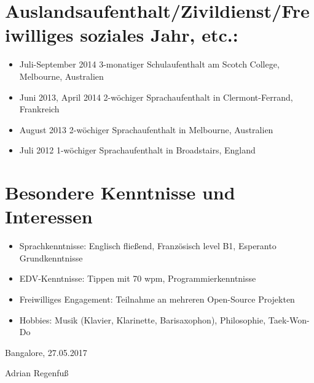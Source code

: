 \documentclass[11pt,a4paper]{article}
\begin{document}
\section*{Auslandsaufenthalt/Zivildienst/Freiwilliges soziales Jahr, etc.:}
\begin{itemize}
\setlength{\itemsep}{1pt}
\item[] Juli-September 2014 \hfill 3-monatiger Schulaufenthalt am Scotch College, Melbourne, Australien
\item[] Juni 2013, April 2014 \hfill 2-wöchiger Sprachaufenthalt in Clermont-Ferrand, Frankreich
\item[] August 2013 \hfill 2-wöchiger Sprachaufenthalt in Melbourne, Australien
\item[] Juli 2012 \hfill 1-wöchiger Sprachaufenthalt in Broadstairs, England
\end{itemize}

\section*{Besondere Kenntnisse und Interessen}
\begin{itemize}
\setlength{\itemsep}{1pt}
\item[] Sprachkenntnisse: \hfill Englisch fließend, Französisch level B1, Esperanto Grundkenntnisse
\item[] EDV-Kenntnisse: \hfill Tippen mit 70 wpm, Programmierkenntnisse
\item[] Freiwilliges Engagement: \hfill Teilnahme an mehreren Open-Source Projekten
\item[] Hobbies: \hfill Musik (Klavier, Klarinette, Barisaxophon), Philosophie, Taek-Won-Do
\end{itemize}

Bangalore, 27.05.2017

Adrian Regenfuß
\end{document}

